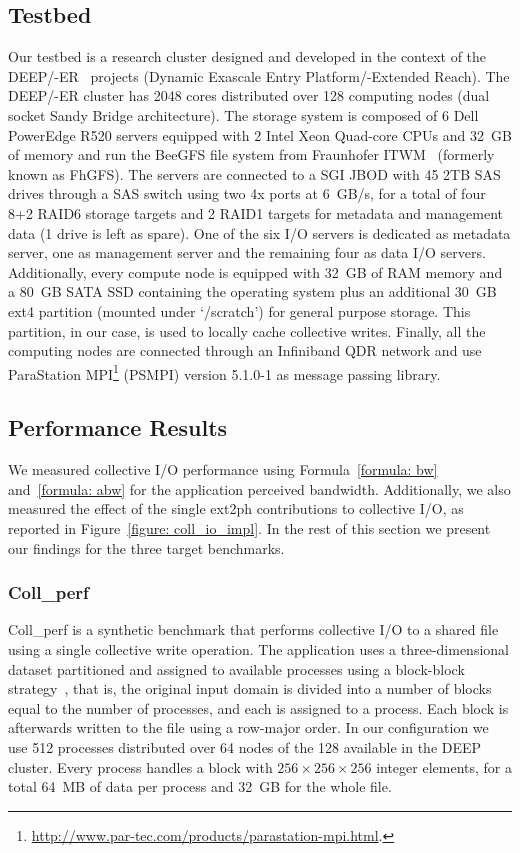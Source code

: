 \subsection{Testbed}
Our testbed is a research cluster designed and developed in the context of the DEEP/-ER~\cite{Eicker2013} projects (Dynamic Exascale Entry Platform/-Extended Reach). The 
DEEP/-ER cluster has 2048 cores distributed over 128 computing nodes (dual socket Sandy Bridge architecture). The storage system is composed of 6 Dell PowerEdge 
R520 servers equipped with 2 Intel Xeon Quad-core CPUs and 32~GB of memory and run the BeeGFS file system from Fraunhofer ITWM~\cite{Heichler2014}
(formerly known as FhGFS). The servers are connected to a SGI JBOD with 45 2TB SAS drives through a SAS switch using two 4x ports at 6~GB/s, for a total of four 
8+2 RAID6 storage targets and 2 RAID1 targets for metadata and management data (1 drive is left as spare). One of the six I/O servers is dedicated as metadata 
server, one as management server and the remaining four as data I/O servers.
Additionally, every compute node is equipped with 32~GB of RAM memory and a 80~GB SATA SSD containing the operating system plus an additional 30~GB ext4 partition 
(mounted under `/scratch') for general purpose storage. This partition, in our case, is used to locally cache collective writes. Finally, all the computing nodes 
are connected through an Infiniband QDR network and use ParaStation MPI\footnote{\url{http://www.par-tec.com/products/parastation-mpi.html}.} (PSMPI) version 5.1.0-1 
as message passing library.

\subsection{Performance Results}
We measured collective I/O performance using Formula~\ref{formula: bw} and~\ref{formula: abw} for the application perceived bandwidth. Additionally, we also measured
the effect of the single ext2ph contributions to collective I/O, as reported in Figure~\ref{figure: coll_io_impl}. In the rest of this section we present our findings
for the three target benchmarks.

\subsubsection{Coll\_perf}
Coll\_perf is a synthetic benchmark that performs collective I/O to a shared file using a single collective write operation. The application uses a three-dimensional
dataset partitioned and assigned to available processes using a block-block strategy~\cite{Bordawekar1993}, that is, the original input domain is divided into a number of blocks equal to the 
number of processes, and each is assigned to a process. Each block is afterwards written to the file using a row-major order. In our configuration we use 512 processes 
distributed over 64 nodes of the 128 available in the DEEP cluster. Every process handles a block with $256 \times 256 \times 256$ integer elements, for a total 64~MB of data
per process and 32~GB for the whole file.


